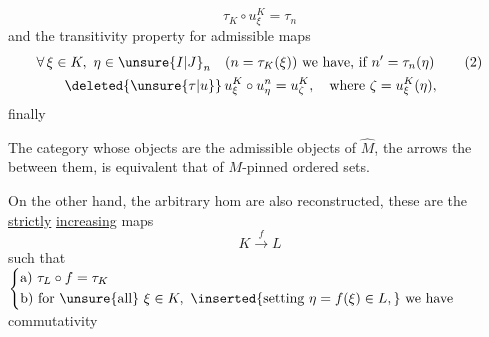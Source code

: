 \begingroup\makeatletter\tagsleft@true\makeatother
\[
\tau_K\circ u_\xi^K=\tau_n\tag*{(1)}
\]
and the transitivity property for admissible maps
\[
\begin{aligned}[t]
&\forall\,\xi\in K,\ \eta\in {\unsure{I|J}}_n\quad(n=\tau_K(\xi))\ \text{we have, if }n'=\tau_n(\eta)\\
&\qquad\deleted{\unsure{\tau|u}}\,u_\xi^K\circ u_\eta^n=u_\zeta^K,\quad\text{where }\zeta=u_\xi^K(\eta),
\end{aligned}\tag*{(2)}
\]
\endgroup
finally


The category whose objects are the admissible objects of $\widehat M$, the arrows the  between them, is equivalent  that of $M$-pinned ordered sets.

On the other hand, the arbitrary hom  are also reconstructed, these are the \uline{strictly} \uline{increasing} maps
\[
K\xrightarrow{f}L
\]
such that $\left\{\begin{aligned}
&\text{a) }\tau_L\circ f=\tau_K\\
&\text{b) for \unsure{all} }\xi\in K,\ \inserted{\text{setting }\eta=f(\xi)\in L,}\ \text{we have}
\end{aligned}\right.$ commutativity 
